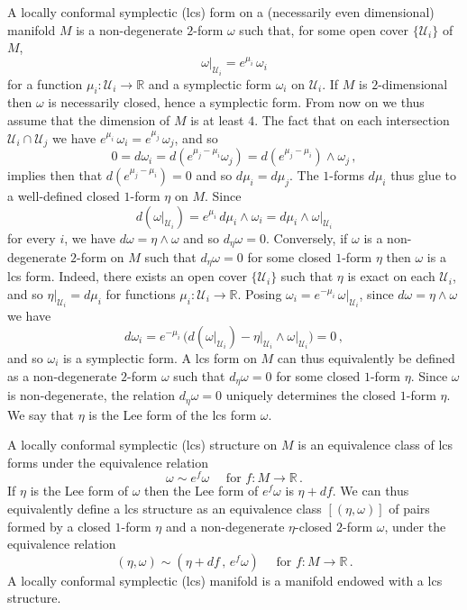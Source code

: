 \documentclass{amsart}
\theoremstyle{remark}
\begin{document}
A locally conformal symplectic (lcs) form
on a (necessarily even dimensional) manifold $M$
is a non-degenerate $2$-form $\omega$
such that, for some open cover $\{\mathcal{U}_i\}$ of $M$,
\[
\left. \omega \right\lvert_{\mathcal{U}_i}
= e^{\mu_i} \, \omega_i
\]
for a function $\mu_i: \mathcal{U}_i \rightarrow \mathbb{R}$
and a symplectic form $\omega_i$ on $\mathcal{U}_i$.
If $M$ is $2$-dimensional then $\omega$ is necessarily closed,
hence a symplectic form.
From now on we thus assume that
the dimension of $M$ is at least $4$.
The fact that on each intersection
$\mathcal{U}_i \cap \mathcal{U}_j$
we have $e^{\mu_i} \, \omega_i = e^{\mu_j} \, \omega_j$,
and so
\[
0 = d\omega_i = d (e^{\mu_j - \mu_i} \omega_j)
= d (e^{\mu_j - \mu_i}) \wedge \omega_j \,,
\]
implies then that $d (e^{\mu_j - \mu_i}) = 0$
and so $d\mu_i = d\mu_j$.
The $1$-forms $d\mu_i$
thus glue to a well-defined closed $1$-form $\eta$ on $M$.
Since
\[
d (\left. \omega \right\lvert_{\mathcal{U}_i})
= e^{\mu_i} \, d\mu_i \wedge \omega_i
= d\mu_i \wedge \left. \omega \right\lvert_{\mathcal{U}_i}
\]
for every $i$,
we have $d\omega = \eta \wedge \omega$
and so $d_{\eta}\omega = 0$.
Conversely,
if $\omega$ is a non-degenerate $2$-form on $M$
such that $d_{\eta}\omega = 0$
for some closed $1$-form $\eta$
then $\omega$ is a lcs form.
Indeed, there exists an open cover $\{\mathcal{U}_i\}$
such that $\eta$ is exact on each $\mathcal{U}_i$,
and so $\left. \eta \right\lvert_{\mathcal{U}_i} = d\mu_i$
for functions $\mu_i: \mathcal{U}_i \rightarrow \mathbb{R}$.
Posing $\omega_i = e^{-\mu_i} \, \left. \omega \right\lvert_{\mathcal{U}_i}$,
since $d\omega = \eta \wedge \omega$ we have
\[
d\omega_i
= e^{-\mu_i} \, \big( d(\left. \omega \right\lvert_{\mathcal{U}_i})
- \left. \eta \right\lvert_{\mathcal{U}_i} \wedge \left. \omega \right\lvert_{\mathcal{U}_i} \big)
= 0 \,,
\]
and so $\omega_i$ is a symplectic form.
A lcs form on $M$ can thus equivalently be defined
as a non-degenerate $2$-form $\omega$
such that $d_{\eta}\omega = 0$
for some closed $1$-form $\eta$.
Since $\omega$ is non-degenerate,
the relation $d_{\eta}\omega = 0$
uniquely determines the closed $1$-form $\eta$.
We say that $\eta$ is the Lee form
of the lcs form $\omega$.

A locally conformal symplectic (lcs) structure on $M$
is an equivalence class of lcs forms
under the equivalence relation
\[
\omega \sim e^f \omega
\quad \text{ for } f: M \rightarrow \mathbb{R} \,.
\]
If $\eta$ is the Lee form of $\omega$
then the Lee form of $e^f \omega$ is $\eta + df$.
We can thus equivalently define a lcs structure
as an equivalence class $[(\eta, \omega)]$
of pairs formed by a closed $1$-form $\eta$
and a non-degenerate $\eta$-closed $2$-form $\omega$,
under the equivalence relation
\[
(\eta, \omega) \sim (\eta + df \,,\, e^f \omega)
\quad \text{ for } f: M \rightarrow \mathbb{R} \,.
\]
A locally conformal symplectic (lcs) manifold
is a manifold endowed with a lcs structure.
\end{document}
